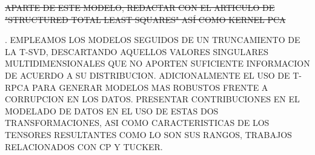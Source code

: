 \documentclass[sensors,article,submit,moreauthors,pdftex]{Definitions/mdpi}
\newcommand{\mathmat}[1]{\boldsymbol{\mathbf{\MakeUppercase{#1}}}}
\newcommand{\mathten}[1]{\boldsymbol{\mathbf{\mathcal{\MakeUppercase{#1}}}}}
\providecommand{\DIFadd}[1]{{\protect\color{blue}\uwave{#1}}} %
\providecommand{\DIFdel}[1]{{\protect\color{red}\sout{#1}}}                      %
\providecommand{\DIFaddbegin}{} %
\providecommand{\DIFaddend}{} %
\providecommand{\DIFdelbegin}{} %
\providecommand{\DIFdelend}{} %
\begin{document}
\DIFdelbegin \DIFdel{APARTE DE ESTE MODELO, REDACTAR CON EL ARTICULO DE "STRUCTURED TOTAL LEAST SQUARES" ASÍ COMO KERNEL PCA}\DIFdelend %
\DIFaddbegin 










\DIFadd{$*********$NOTA$*********$}\DIFaddend . EMPLEAMOS LOS MODELOS SEGUIDOS DE UN TRUNCAMIENTO DE LA T-SVD, DESCARTANDO AQUELLOS VALORES SINGULARES MULTIDIMENSIONALES QUE NO APORTEN SUFICIENTE INFORMACION DE ACUERDO A SU DISTRIBUCION. ADICIONALMENTE EL USO DE T-RPCA PARA GENERAR MODELOS MAS ROBUSTOS FRENTE A CORRUPCION EN LOS DATOS.
PRESENTAR CONTRIBUCIONES EN EL MODELADO DE DATOS EN EL USO DE ESTAS DOS TRANSFORMACIONES, ASI COMO CARACTERISTICAS DE LOS TENSORES RESULTANTES COMO LO SON SUS RANGOS, TRABAJOS RELACIONADOS CON CP Y TUCKER.
\end{document}
